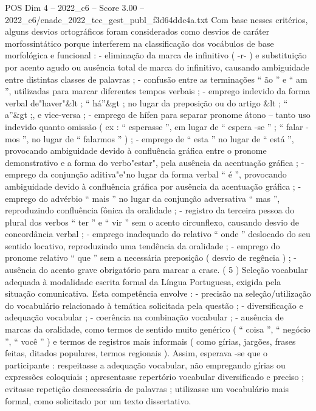 \begin{textsample}{POS Dim 4 – 2022\_c6 – Score 3.00 – 2022\_c6/enade\_2022\_tec\_gest\_publ\_f3d64ddc4a.txt}
Com base nesses critérios, alguns desvios ortográficos foram considerados como desvios de caráter morfossintático porque interferem na classificação dos vocábulos de base morfológica e funcional : - eliminação da marca de infinitivo ( -r- ) e substituição por acento agudo ou ausência total de marca do infinitivo, causando ambiguidade entre distintas classes de palavras ; - confusão entre as terminações “ ão ” e “ am ”, utilizadas para marcar diferentes tempos verbais ; - emprego indevido da forma verbal de"haver"\&lt ; “ há”\&gt ; no lugar da preposição ou do artigo \&lt ; “ a”\&gt ;, e vice-versa ; - emprego de hífen para separar pronome átono – tanto uso indevido quanto omissão ( ex : “ esperasse ”, em lugar de “ espera -se ” ; “ falar -mos ”, no lugar de “ falarmos ” ) ; - emprego de “ esta ” no lugar de “ está ”, provocando ambiguidade devido à confluência gráfica entre o pronome demonstrativo e a forma do verbo"estar", pela ausência da acentuação gráfica ; - emprego da conjunção aditiva"e"no lugar da forma verbal “ é ”, provocando ambiguidade devido à confluência gráfica por ausência da acentuação gráfica ; - emprego do advérbio “ mais ” no lugar da conjunção adversativa “ mas ”, reproduzindo confluência fônica da oralidade ; - registro da terceira pessoa do plural dos verbos “ ter ” e “ vir ” sem o acento circunflexo, causando desvio de concordância verbal ; - emprego inadequado do relativo “ onde ” deslocado do seu sentido locativo, reproduzindo uma tendência da oralidade ; - emprego do pronome relativo “ que ” sem a necessária preposição ( desvio de regência ) ; - ausência do acento grave obrigatório para marcar a crase. ( 5 ) Seleção vocabular adequada à modalidade escrita formal da Língua Portuguesa, exigida pela situação comunicativa.
Esta competência envolve : - precisão na seleção/utilização do vocabulário relacionado à temática solicitada pela questão ; - diversificação e adequação vocabular ; - coerência na combinação vocabular ; - ausência de marcas da oralidade, como termos de sentido muito genérico ( “ coisa ”, “ negócio ”, “ você ” ) e termos de registros mais informais ( como gírias, jargões, frases feitas, ditados populares, termos regionais ).
Assim, esperava -se que o participante : respeitasse a adequação vocabular, não empregando gírias ou expressões coloquiais ; apresentasse repertório vocabular diversificado e preciso ; evitasse repetição desnecessária de palavras ; utilizasse um vocabulário mais formal, como solicitado por um texto dissertativo.

\end{textsample}
